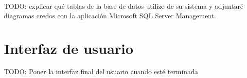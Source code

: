 
TODO: explicar qué tablas de la base de datos utilizo de su sistema y adjuntaré  diagramas credos con la aplicación Microsoft SQL Server Management. \\

\section{Interfaz de usuario}


TODO: Poner la interfaz final del usuario cuando esté terminada

